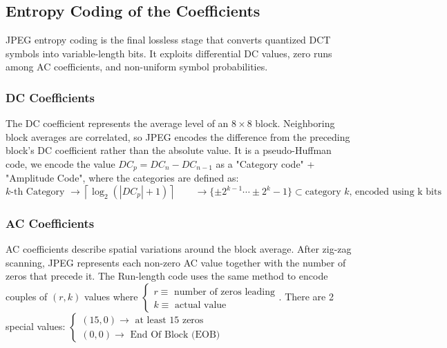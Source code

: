\subsection{Entropy Coding of the Coefficients}
JPEG entropy coding is the final lossless stage that converts quantized DCT symbols into variable-length bits. It exploits differential DC values, zero runs among AC coefficients, and non-uniform symbol probabilities.
\subsubsection{DC Coefficients}
The DC coefficient represents the average level of an $8\times8$ block. Neighboring block averages are correlated, so JPEG encodes the difference from the preceding block's DC coefficient rather than the absolute value.
It is a pseudo-Huffman code, we encode the value $DC_p = DC_n - DC_{n-1}$ as a "Category code" + "Amplitude Code", where the categories are defined as:
$$k\text{-th Category }\to \left\lceil\log_2\left(|DC_p| + 1\right)\right\rceil \qquad \to \{\pm2^{k-1}\cdots \pm 2^k - 1\} \subset \text{category }k\text{, encoded using k bits}$$
\subsubsection{AC Coefficients}
AC coefficients describe spatial variations around the block average. After zig-zag scanning, JPEG represents each non-zero AC value together with the number of zeros that precede it.
The Run-length code uses the same method to encode couples of $(r,k)$ values where $\begin{cases}
    r \equiv \text{ number of zeros leading}\\
    k \equiv \text{ actual value}
\end{cases}$.
There are 2 special values: $\begin{cases}
    (15,0) \to \text{ at least 15 zeros}\\
    (0,0) \to \text{ End Of Block (EOB)}
\end{cases}$
